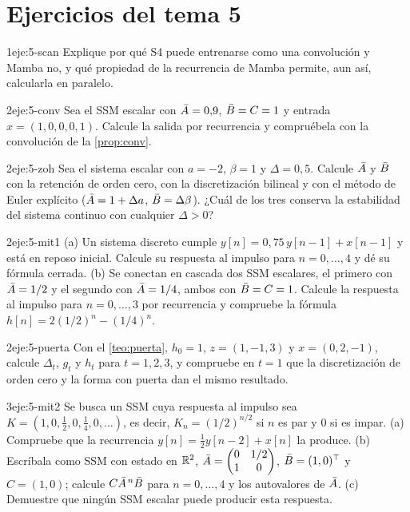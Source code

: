 \section*{Ejercicios del tema 5}

\begin{ejercicio}{1}{eje:5-scan}
Explique por qué S4 puede entrenarse como una convolución y Mamba no, y qué propiedad de la recurrencia de Mamba permite, aun así, calcularla en paralelo.
\end{ejercicio}

\begin{ejercicio}{2}{eje:5-conv}
Sea el SSM escalar con $\bar{A}=0{,}9$, $\bar{B}=C=1$ y entrada $x=(1,0,0,0,1)$. Calcule la salida por recurrencia y compruébela con la convolución de la \cref{prop:conv}.
\end{ejercicio}

\begin{ejercicio}{2}{eje:5-zoh}
Sea el sistema escalar con $a=-2$, $\beta=1$ y $\Delta=0{,}5$. Calcule $\bar{A}$ y $\bar{B}$ con la retención de orden cero, con la discretización bilineal y con el método de Euler explícito ($\bar{A}=1+\Delta a$, $\bar{B}=\Delta\beta$). ¿Cuál de los tres conserva la estabilidad del sistema continuo con cualquier $\Delta>0$?
\end{ejercicio}

\begin{ejercicio}{2}{eje:5-mit1}
(a) Un sistema discreto cumple $y[n]=0{,}75\,y[n-1]+x[n-1]$ y está en reposo inicial. Calcule su respuesta al impulso para $n=0,\dots,4$ y dé su fórmula cerrada. (b) Se conectan en cascada dos SSM escalares, el primero con $\bar{A}=1/2$ y el segundo con $\bar{A}=1/4$, ambos con $\bar{B}=C=1$. Calcule la respuesta al impulso para $n=0,\dots,3$ por recurrencia y compruebe la fórmula $h[n]=2(1/2)^{n}-(1/4)^{n}$.
\end{ejercicio}

\begin{ejercicio}{2}{eje:5-puerta}
Con el \cref{teo:puerta}, $h_0=1$, $z=(1,-1,3)$ y $x=(0,2,-1)$, calcule $\Delta_t$, $g_t$ y $h_t$ para $t=1,2,3$, y compruebe en $t=1$ que la discretización de orden cero y la forma con puerta dan el mismo resultado.
\end{ejercicio}

\begin{ejercicio}{3}{eje:5-mit2}
Se busca un SSM cuya respuesta al impulso sea $K=(1,0,\frac12,0,\frac14,0,\dots)$, es decir, $K_n=(1/2)^{n/2}$ si $n$ es par y $0$ si es impar. (a) Compruebe que la recurrencia $y[n]=\frac12y[n-2]+x[n]$ la produce. (b) Escríbala como SSM con estado en $\mathbb{R}^{2}$, $\bar{A}=\begin{pmatrix}0&1/2\\1&0\end{pmatrix}$, $\bar{B}=(1,0)^{\top}$ y $C=(1,0)$; calcule $C\bar{A}^{\,n}\bar{B}$ para $n=0,\dots,4$ y los autovalores de $\bar{A}$. (c) Demuestre que ningún SSM escalar puede producir esta respuesta.
\end{ejercicio}

